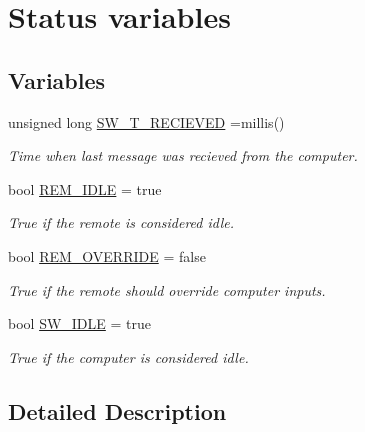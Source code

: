 \hypertarget{group__StatusVariables}{}\section{Status variables}
\label{group__StatusVariables}
\subsection*{Variables}
\begin{DoxyCompactItemize}
\item 
unsigned long \hyperlink{group__StatusVariables_ga82efae9ec88cdde7eaa3cd149aa5756c}{S\+W\+\_\+\+T\+\_\+\+R\+E\+C\+I\+E\+V\+ED} =millis()\hypertarget{group__StatusVariables_ga82efae9ec88cdde7eaa3cd149aa5756c}{}\label{group__StatusVariables_ga82efae9ec88cdde7eaa3cd149aa5756c}

\begin{DoxyCompactList}\small\item\em Time when last message was recieved from the computer. \end{DoxyCompactList}\item 
bool \hyperlink{group__StatusVariables_ga1dc5fbe81aa54db10c814d5ff7adba6f}{R\+E\+M\+\_\+\+I\+D\+LE} = true\hypertarget{group__StatusVariables_ga1dc5fbe81aa54db10c814d5ff7adba6f}{}\label{group__StatusVariables_ga1dc5fbe81aa54db10c814d5ff7adba6f}

\begin{DoxyCompactList}\small\item\em True if the remote is considered idle. \end{DoxyCompactList}\item 
bool \hyperlink{group__StatusVariables_gae31e17311163c382d2de940091954419}{R\+E\+M\+\_\+\+O\+V\+E\+R\+R\+I\+DE} = false\hypertarget{group__StatusVariables_gae31e17311163c382d2de940091954419}{}\label{group__StatusVariables_gae31e17311163c382d2de940091954419}

\begin{DoxyCompactList}\small\item\em True if the remote should override computer inputs. \end{DoxyCompactList}\item 
bool \hyperlink{group__StatusVariables_ga5f2f8cd3c1e83a4aac8976d9dbb71e4b}{S\+W\+\_\+\+I\+D\+LE} = true\hypertarget{group__StatusVariables_ga5f2f8cd3c1e83a4aac8976d9dbb71e4b}{}\label{group__StatusVariables_ga5f2f8cd3c1e83a4aac8976d9dbb71e4b}

\begin{DoxyCompactList}\small\item\em True if the computer is considered idle. \end{DoxyCompactList}\end{DoxyCompactItemize}


\subsection{Detailed Description}
